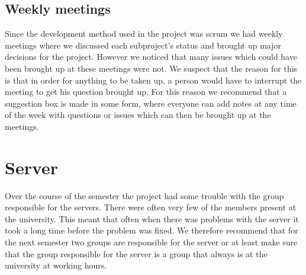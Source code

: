\subsection{Weekly meetings}
Since the development method used in the project was scrum we had weekly meetings where we discussed each subproject’s status and brought up major decisions for the project. However we noticed that many issues which could have been brought up at these meetings were not. We suspect that the reason for this is that in order for anything to be taken up, a person would have to interrupt the meeting to get his question brought up. For this reason we recommend that a suggestion box is made in some form, where everyone can add notes at any time of the week with questions or issues which can then be brought up at the meetings.

\section{Server}
Over the course of the semester the project had some trouble with the group responsible for the servers. There were often very few of the members present at the university. This meant that often when there was problems with the server it took a long time before the problem was fixed. We therefore recommend that for the next semester two groups are responsible for the server or at least make sure that the group responsible for the server is a group that always is at the university at working hours.